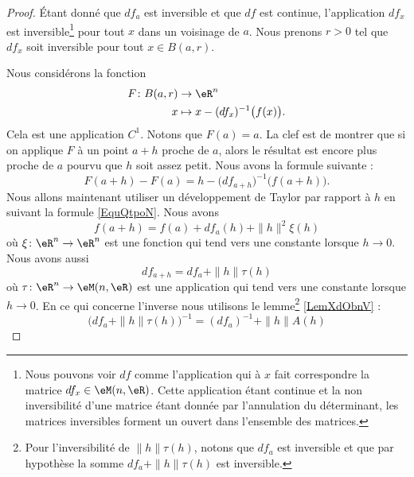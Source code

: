 \begin{proof}
    Étant donné que \( df_a\) est inversible et que \( df\) est continue, l'application \( df_x\) est inversible\footnote{Nous pouvons voir \( df\) comme l'application qui à \( x\) fait correspondre la matrice \( df_x\in\eM(n,\eR)\). Cette application étant continue et la non inversibilité d'une matrice étant donnée par l'annulation du déterminant, les matrices inversibles forment un ouvert dans l'ensemble des matrices.} pour tout \( x\) dans un voisinage de \( a\). Nous prenons \( r>0\) tel que \( df_x\) soit inversible pour tout \( x\in B(a,r)\).

    Nous considérons la fonction 
    \begin{equation}
        \begin{aligned}
                F\colon B(a,r)&\to \eR^n \\
                x&\mapsto x-(df_x)^{-1}\big( f(x) \big). 
            \end{aligned}
        \end{equation}
        Cela est une application \( C^1\). Notons que \( F(a)=a\). La clef est de montrer que si on applique \( F\) à un point \( a+h\) proche de \( a\), alors le résultat est encore plus proche de \( a\) pourvu que \( h\) soit assez petit. Nous avons la formule suivante :
        \begin{equation}        \label{EqyDLQeE}
            F(a+h)-F(a)=h-\big( df_{a+h} \big)^{-1}\big( f(a+h) \big).
        \end{equation}
        Nous allons maintenant utiliser un développement de Taylor par rapport à \( h\) en suivant la formule \eqref{EquQtpoN}. Nous avons
        \begin{equation}
            f(a+h)=f(a)+df_a(h)+\| h \|^2\xi(h)
        \end{equation}
        où \( \xi\colon \eR^n\to \eR^n\) est une fonction qui tend vers une constante lorsque \( h\to 0\). Nous avons aussi
        \begin{equation}
            df_{a+h}=df_a+\| h \|\tau(h)
        \end{equation}
        où \( \tau\colon \eR^n\to \eM(n,\eR)\) est une application qui tend vers une constante lorsque \( h\to 0\). En ce qui concerne l'inverse nous utilisons le lemme\footnote{Pour l'inversibilité de \( \| h \|\tau(h)\), notons que \( df_a\) est inversible et que par hypothèse la somme \( df_a+\| h \|\tau(h)\) est inversible.} \ref{LemXdObnV} :
        \begin{equation}
            \big( df_a+\| h \|\tau(h) \big)^{-1}=(df_a)^{-1}+\| h \|A(h)

\end{equation}
\end{proof}
